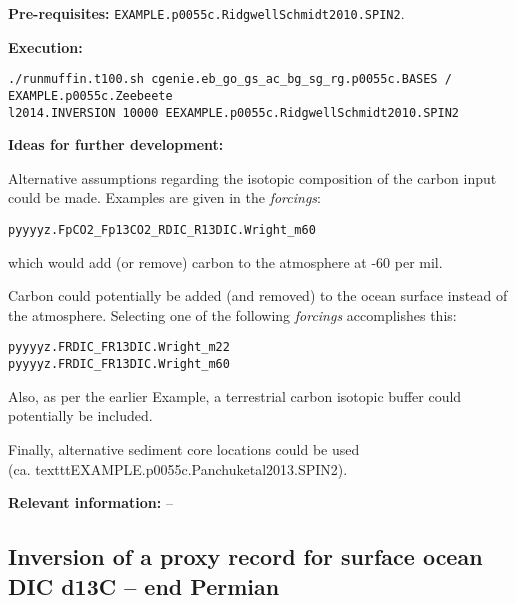\documentclass[10pt,twoside]{article}
\begin{document}
\noindent \textbf{Pre-requisites:} \texttt{EXAMPLE.p0055c.RidgwellSchmidt2010.SPIN2}.

\noindent \textbf{Execution:} 
\vspace{-10pt}\small\begin{verbatim}./runmuffin.t100.sh cgenie.eb_go_gs_ac_bg_sg_rg.p0055c.BASES / EXAMPLE.p0055c.Zeebeete
l2014.INVERSION 10000 EEXAMPLE.p0055c.RidgwellSchmidt2010.SPIN2\end{verbatim}\normalsize\vspace{-10pt}

\noindent \textbf{Ideas for further development:}

\begin{compactitem}
\item Alternative assumptions regarding the isotopic composition of the carbon input could be made. Examples are given in the \textit{forcings}:
\vspace{-5pt}\begin{verbatim}
pyyyyz.FpCO2_Fp13CO2_RDIC_R13DIC.Wright_m60
\end{verbatim}\vspace{-5pt}
which would add (or remove) carbon to the atmosphere at -60 per mil.
\item Carbon could potentially be added (and removed) to the ocean surface instead of the atmosphere. Selecting one of the following \textit{forcings} accomplishes this:
\vspace{-5pt}\begin{verbatim}
pyyyyz.FRDIC_FR13DIC.Wright_m22
pyyyyz.FRDIC_FR13DIC.Wright_m60
\end{verbatim}\vspace{-5pt}
\item Also, as per the earlier Example, a terrestrial carbon isotopic buffer could potentially be included.
\item Finally, alternative sediment core locations could be used
\\ (ca. texttt{EXAMPLE.p0055c.Panchuketal2013.SPIN2}).
        \end{compactitem}

\noindent \textbf{Relevant information:} --


\subsection{Inversion of a proxy record for surface ocean DIC d13C -- end Permian}\label{EXAMPLE.p0251b.PO4.DIC13CINVERSION}
\end{document}
